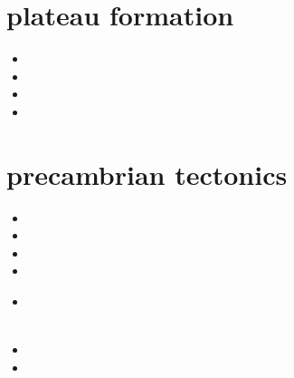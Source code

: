 \section{plateau formation}


\begin{small}
\begin{itemize}
\item[1995] 
\item[1996] 
\item[2017] 
\item[2023] 
\end{itemize}
\end{small}






\section{precambrian tectonics}

\begin{small}
\begin{itemize}
\item[\nineteenninetyfour] 
\item[\twothousandthree] 
\item[\twothousandten] 
\item[\twothousandeleven] 
\item[\twothousandfourteen] 
 \\
 \\
\item[\twothousandtwenty] 
\item[\twothousandtwentyfive] 
\end{itemize}
\end{small}


